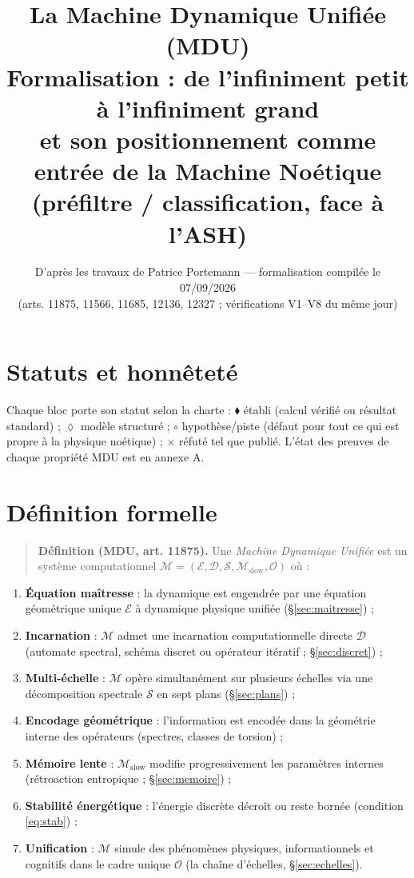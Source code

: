 \documentclass[11pt,a4paper]{article}
\title{\textbf{La Machine Dynamique Unifiée (MDU)}\\
\large Formalisation : de l'infiniment petit à l'infiniment grand\\
\normalsize et son positionnement comme entrée de la Machine Noétique (préfiltre / classification, face à l'ASH)}
\author{D'après les travaux de Patrice Portemann --- formalisation compilée le 07/09/2026\\
(arts. 11875, 11566, 11685, 12136, 12327 ; vérifications V1--V8 du même jour)}
\date{}
\newcommand{\SET}{\ensuremath{\blacklozenge}}
\newcommand{\SMOD}{\ensuremath{\lozenge}}
\newcommand{\SCONJ}{\ensuremath{\circ}}
\newcommand{\SREF}{\ensuremath{\times}}
\begin{document}
\maketitle

\section*{Statuts et honnêteté}
Chaque bloc porte son statut selon la charte : \SET{} établi (calcul vérifié ou résultat standard) ; \SMOD{} modèle structuré ; \SCONJ{} hypothèse/piste (défaut pour tout ce qui est propre à la physique noétique) ; \SREF{} réfuté tel que publié. L'état des preuves de chaque propriété MDU est en annexe A.

\tableofcontents
\newpage

\section{Définition formelle}

\begin{quote}
\textbf{Définition (MDU, art. 11875).} Une \emph{Machine Dynamique Unifiée} est un système computationnel $\mathcal{M} = (\mathcal{E}, \mathcal{D}, \mathcal{S}, \mathcal{M}_{\mathrm{slow}}, \mathcal{O})$ où :
\end{quote}

\begin{enumerate}
\item \textbf{Équation maîtresse} : la dynamique est engendrée par une équation géométrique unique $\mathcal{E}$ à dynamique physique unifiée (\S\ref{sec:maitresse}) ;
\item \textbf{Incarnation} : $\mathcal{M}$ admet une incarnation computationnelle directe $\mathcal{D}$ (automate spectral, schéma discret ou opérateur itératif ; \S\ref{sec:discret}) ;
\item \textbf{Multi-échelle} : $\mathcal{M}$ opère simultanément sur plusieurs échelles via une décomposition spectrale $\mathcal{S}$ en sept plans (\S\ref{sec:plans}) ;
\item \textbf{Encodage géométrique} : l'information est encodée dans la géométrie interne des opérateurs (spectres, classes de torsion) ;
\item \textbf{Mémoire lente} : $\mathcal{M}_{\mathrm{slow}}$ modifie progressivement les paramètres internes (rétroaction entropique ; \S\ref{sec:memoire}) ;
\item \textbf{Stabilité énergétique} : l'énergie discrète décroît ou reste bornée (condition \eqref{eq:stab}) ;
\item \textbf{Unification} : $\mathcal{M}$ simule des phénomènes physiques, informationnels et cognitifs dans le cadre unique $\mathcal{O}$ (la chaîne d'échelles, \S\ref{sec:echelles}).
\end{enumerate}
\end{document}
